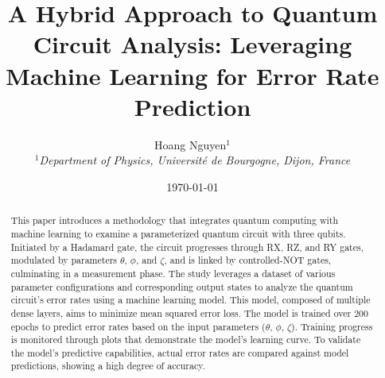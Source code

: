 \documentclass{article}
\title{A Hybrid Approach to Quantum Circuit Analysis: Leveraging Machine Learning for Error Rate Prediction}
\author{
Hoang Nguyen$^1$ \\
{\small $^1$\textit{Department of Physics, Université de Bourgogne, Dijon, France}}
}
\date{\today}
\begin{document}
\maketitle

\renewcommand{\thefootnote}{\arabic{footnote}}
\setcounter{footnote}{0}


\begin{abstract}
        This paper introduces a methodology that integrates quantum computing with machine learning to examine a parameterized quantum circuit with three qubits. Initiated by a Hadamard gate, the circuit progresses through RX, RZ, and RY gates, modulated by parameters $\theta$, $\phi$, and $\zeta$, and is linked by controlled-NOT gates, culminating in a measurement phase. The study leverages a dataset of various parameter configurations and corresponding output states to analyze the quantum circuit's error rates using a machine learning model. This model, composed of multiple dense layers, aims to minimize mean squared error loss. The model is trained over 200 epochs to predict error rates based on the input parameters ($\theta$, $\phi$, $\zeta$). Training progress is monitored through plots that demonstrate the model's learning curve. To validate the model's predictive capabilities, actual error rates are compared against model predictions, showing a high degree of accuracy.
\end{abstract}
\end{document}
